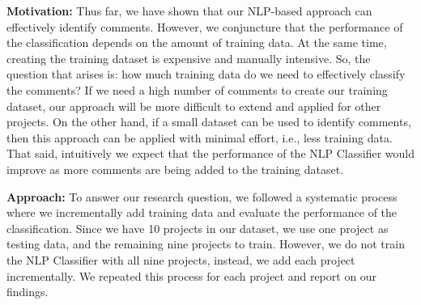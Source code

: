 

\vspace{3mm}
\noindent\rqiii
\vspace{3mm}

\noindent \textbf{Motivation:} Thus far, we have shown that our NLP-based approach can effectively identify \SATD comments. However, we conjuncture that the performance of the classification depends on the amount of training data. At the same time, creating the training dataset is expensive and manually intensive. So, the question that arises is: how much training data do we need to effectively classify the \SATD comments? If we need a high number of comments to create our training dataset, our approach will be more difficult to extend and applied for other projects. On the other hand, if a small dataset can be used to identify \SATD comments, then this approach can be applied with minimal effort, i.e., less training data. That said, intuitively we expect that the performance of the NLP Classifier would improve as more comments are being added to the training dataset.


\noindent \textbf{Approach:} To answer our research question, we followed a systematic process where we incrementally add training data and evaluate the performance of the classification. Since we have 10 projects in our dataset, we use one project as testing data, and the remaining nine projects to train. However, we do not train the NLP Classifier with all nine projects, instead, we add each project incrementally. We repeated this process for each project and report on our findings.




